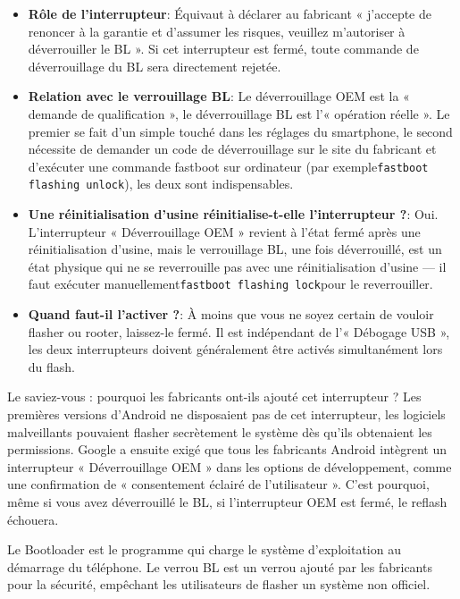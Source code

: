 \begin{itemize}
  \item \textbf{Rôle de l'interrupteur}: Équivaut à déclarer au fabricant « j'accepte de renoncer à la garantie et d'assumer les risques, veuillez m'autoriser à déverrouiller le BL ». Si cet interrupteur est fermé, toute commande de déverrouillage du BL sera directement rejetée.
  \item \textbf{Relation avec le verrouillage BL}: Le déverrouillage OEM est la « demande de qualification », le déverrouillage BL est l'« opération réelle ». Le premier se fait d'un simple touché dans les réglages du smartphone, le second nécessite de demander un code de déverrouillage sur le site du fabricant et d'exécuter une commande fastboot sur ordinateur (par exemple\texttt{fastboot flashing unlock}), les deux sont indispensables.
  \item \textbf{Une réinitialisation d'usine réinitialise-t-elle l'interrupteur ?}: Oui. L'interrupteur « Déverrouillage OEM » revient à l'état fermé après une réinitialisation d'usine, mais le verrouillage BL, une fois déverrouillé, est un état physique qui ne se reverrouille pas avec une réinitialisation d'usine — il faut exécuter manuellement\texttt{fastboot flashing lock}pour le reverrouiller.
  \item \textbf{Quand faut-il l'activer ?}: À moins que vous ne soyez certain de vouloir flasher ou rooter, laissez-le fermé. Il est indépendant de l'« Débogage USB », les deux interrupteurs doivent généralement être activés simultanément lors du flash.
\end{itemize}

\begin{tcbinfo}{Le saviez-vous : pourquoi les fabricants ont-ils ajouté cet interrupteur ?}
Les premières versions d'Android ne disposaient pas de cet interrupteur, les logiciels malveillants pouvaient flasher secrètement le système dès qu'ils obtenaient les permissions. Google a ensuite exigé que tous les fabricants Android intègrent un interrupteur « Déverrouillage OEM » dans les options de développement, comme une confirmation de « consentement éclairé de l'utilisateur ». C'est pourquoi, même si vous avez déverrouillé le BL, si l'interrupteur OEM est fermé, le reflash échouera.

\end{tcbinfo}


Le Bootloader est le programme qui charge le système d'exploitation au démarrage du téléphone. Le verrou BL est un verrou ajouté par les fabricants pour la sécurité, empêchant les utilisateurs de flasher un système non officiel.

